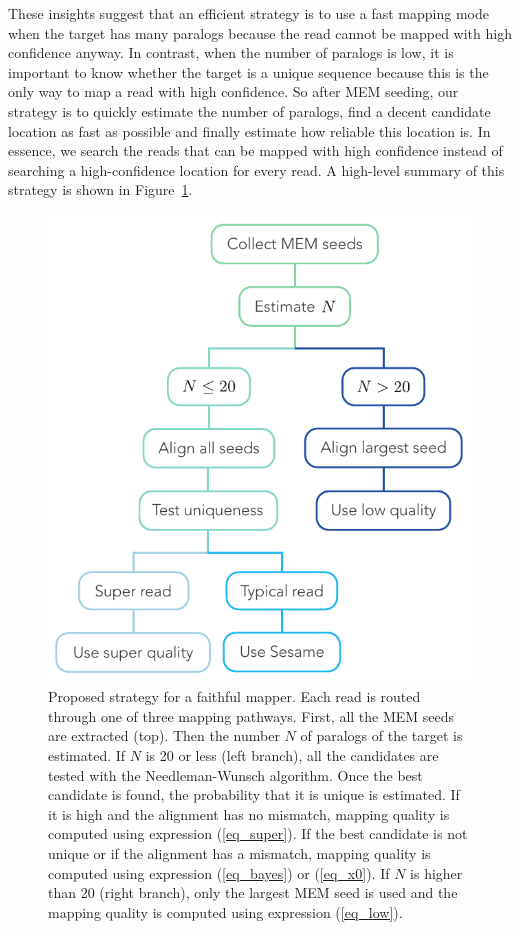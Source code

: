 \documentclass[a4,center,fleqn]{NAR}
\begin{document}
These insights suggest that an efficient strategy is to use a fast mapping
mode when the target has many paralogs because the read cannot be mapped
with high confidence anyway. In contrast, when the number of paralogs is
low, it is important to know whether the target is a unique sequence
because this is the only way to map a read with high confidence. So after
MEM seeding, our strategy is to quickly estimate the number of paralogs,
find a decent candidate location as fast as possible and finally estimate
how reliable this location is. In essence, we search the reads that
can be mapped with high confidence instead of searching a high-confidence
location for every read. A high-level summary of this strategy is shown in
Figure~\ref{fig_tree}.

\begin{figure}[t]
\begin{center}
\includegraphics[scale=.8]{decision_tree.pdf}
\end{center}
\caption{Proposed strategy for a faithful mapper. Each read is routed
through one of three mapping pathways. First, all the MEM seeds are
extracted (top). Then the number $N$ of paralogs of the target is
estimated. If $N$ is 20 or less (left branch), all the candidates are
tested with the Needleman-Wunsch algorithm. Once the best candidate is
found, the probability that it is unique is estimated. If it is high and
the alignment has no mismatch, mapping quality is computed using
expression (\ref{eq_super}). If the best candidate is not unique or if the
alignment has a mismatch, mapping quality is computed using expression
(\ref{eq_bayes}) or (\ref{eq_x0}). If $N$ is higher than 20 (right
branch), only the largest MEM seed is used and the mapping quality is
computed using expression (\ref{eq_low}).}
\label{fig_tree}
\end{figure}
\end{document}

